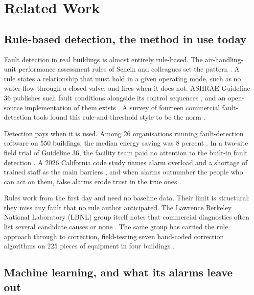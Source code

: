 \documentclass[conference]{IEEEtran}
\begin{document}
\section{Related Work}
\label{sec:related}

\subsection{Rule-based detection, the method in use today}

Fault detection in real buildings is almost entirely rule-based. The air-handling-unit performance assessment rules of Schein and colleagues set the pattern \cite{schein2006apar}. A rule states a relationship that must hold in a given operating mode, such as no water flow through a closed valve, and fires when it does not. ASHRAE Guideline 36 publishes such fault conditions alongside its control sequences \cite{ashrae2021guideline36,ashrae2024guideline36}, and an open-source implementation of them exists \cite{openfdd2025}. A survey of fourteen commercial fault-detection tools found this rule-and-threshold style to be the norm \cite{granderson2017fddtoolsurvey}.

Detection pays when it is used. Among 26 organisations running fault-detection software on 550 buildings, the median energy saving was 8 percent \cite{lin2020achievedsavings}. In a two-site field trial of Guideline 36, the facility team paid no attention to the built-in fault detection \cite{zhou2025g36field}. A 2026 California code study names alarm overload and a shortage of trained staff as the main barriers \cite{case2026fdd}, and when alarms outnumber the people who can act on them, false alarms erode trust in the true ones \cite{diallo2026alarmfatigue}.

Rules work from the first day and need no baseline data. Their limit is structural: they miss any fault that no rule author anticipated. The Lawrence Berkeley National Laboratory (LBNL) group itself notes that commercial diagnostics often list several candidate causes or none \cite{lin2025activemultimode}. The same group has carried the rule approach through to correction, field-testing seven hand-coded correction algorithms on 225 pieces of equipment in four buildings \cite{lin2020faultcorrection,pritoni2022faultcorrection}.

\subsection{Machine learning, and what its alarms leave out}
\end{document}
